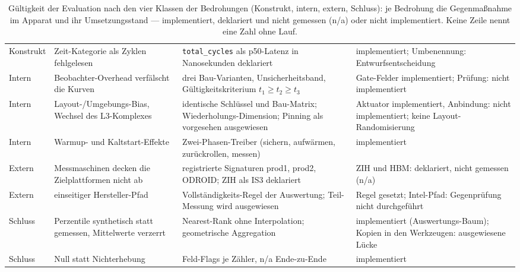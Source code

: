 \begin{nurkurz}
\begin{table}[htbp]
\begin{tabular}{@{}>{\raggedright\arraybackslash}p{1.6cm}>{\raggedright\arraybackslash}p{4.0cm}>{\raggedright\arraybackslash}p{4.9cm}>{\raggedright\arraybackslash}p{3.7cm}@{}}
Konstrukt & Zeit-Kategorie als Zyklen fehlgelesen & \texttt{total\_cycles} als p50-Latenz in Nanosekunden deklariert & implementiert; Umbenennung: Entwurfsentscheidung \\
Intern & Beobachter-Overhead verfälscht die Kurven & drei Bau-Varianten, Unsicherheitsband, Gültigkeitskriterium $t_1 \ge t_2 \ge t_3$ & Gate-Felder implementiert; Prüfung: nicht implementiert \\
Intern & Layout-/Umgebungs-Bias, Wechsel des L3-Komplexes & identische Schlüssel und Bau-Matrix; Wiederholungs-Dimension; Pinning als vorgesehen ausgewiesen & Aktuator implementiert, Anbindung: nicht implementiert; keine Layout-Randomisierung \\
Intern & Warmup- und Kaltstart-Effekte & Zwei-Phasen-Treiber (sichern, aufwärmen, zurückrollen, messen) & implementiert \\
Extern & Messmaschinen decken die Zielplattformen nicht ab & registrierte Signaturen prod1, prod2, ODROID\@; ZIH als IS3 deklariert & ZIH und HBM\@: deklariert, nicht gemessen (n/a) \\
Extern & einseitiger Hersteller-Pfad & Vollständigkeits-Regel der Auswertung; Teil-Messung wird ausgewiesen & Regel gesetzt; Intel-Pfad: Gegenprüfung nicht durchgeführt \\
Schluss & Perzentile synthetisch statt gemessen, Mittelwerte verzerrt & Nearest-Rank ohne Interpolation; geometrische Aggregation & implementiert (Auswertungs-Baum); Kopien in den Werkzeugen: ausgewiesene Lücke \\
Schluss & Null statt Nichterhebung & Feld-Flags je Zähler, n/a Ende-zu-Ende & implementiert \\
\bottomrule
\end{tabular}
\caption{Gültigkeit der Evaluation nach den vier Klassen der Bedrohungen (Konstrukt, intern, extern,
Schluss): je Bedrohung die Gegenmaßnahme im Apparat und ihr Umsetzungsstand --- implementiert,
deklariert und nicht gemessen (n/a) oder nicht implementiert. Keine Zeile nennt eine Zahl ohne
Lauf.}\label{tab:eval-gueltigkeit}
\end{table}
\end{nurkurz}


